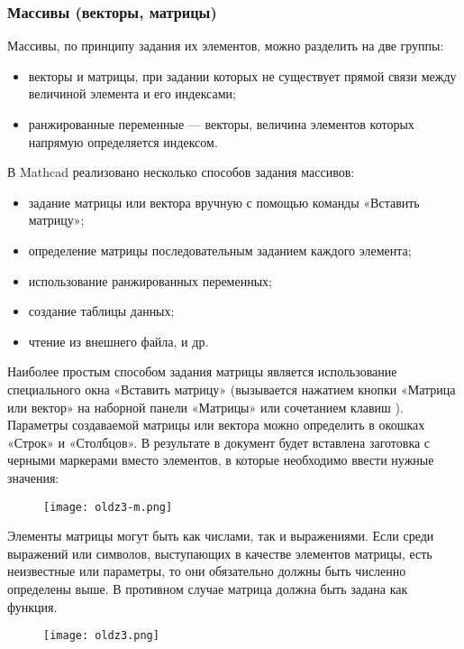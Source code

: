 \subsubsection{Массивы (векторы, матрицы)}
Массивы, по принципу задания их элементов, можно разделить на две группы:
\begin{itemize}
	\item векторы и матрицы, при задании которых не существует прямой связи между величиной элемента и его индексами;
	\item ранжированные переменные --- векторы, величина элементов которых напрямую определяется индексом.
\end{itemize}
В Mathcad реализовано несколько способов задания массивов:
\begin{itemize}
	\item задание матрицы или вектора вручную с помощью команды «Вставить матрицу»;
	\item определение матрицы последовательным заданием каждого элемента;
	\item  использование ранжированных переменных;
	\item создание таблицы данных;
	\item чтение из внешнего файла, и др.
\end{itemize}

Наиболее простым способом задания матрицы является использование специального окна «Вставить матрицу» (вызывается нажатием кнопки «Матрица или вектор» на наборной панели «Матрицы» или сочетанием клавиш ). Параметры создаваемой матрицы или вектора можно определить в окошках «Строк» и «Столбцов». В результате в документ будет вставлена заготовка с черными маркерами вместо элементов, в которые необходимо ввести нужные значения:
\begin{figure}[h]
	\begin{center}
		\texttt{[image: oldz3-m.png]}
	\end{center}
\end{figure}

Элементы матрицы могут быть как числами, так и выражениями. Если среди выражений или символов, выступающих в качестве элементов матрицы, есть неизвестные или параметры, то они обязательно должны быть численно определены выше. В противном случае матрица должна быть задана как функция.

\begin{figure}[h]
	\begin{center}
		\texttt{[image: oldz3.png]}
	\end{center}
\end{figure}

